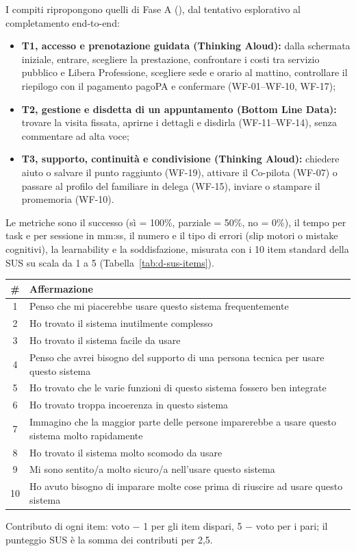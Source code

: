 I compiti ripropongono quelli di Fase A (), dal tentativo esplorativo al completamento end-to-end:
\begin{itemize}
\item \textbf{T1, accesso e prenotazione guidata (Thinking Aloud):} dalla schermata iniziale, entrare, scegliere la prestazione, confrontare i costi tra servizio pubblico e Libera Professione, scegliere sede e orario al mattino, controllare il riepilogo con il pagamento pagoPA e confermare (WF-01--WF-10, WF-17);
\item \textbf{T2, gestione e disdetta di un appuntamento (Bottom Line Data):} trovare la visita fissata, aprirne i dettagli e disdirla (WF-11--WF-14), senza commentare ad alta voce;
\item \textbf{T3, supporto, continuità e condivisione (Thinking Aloud):} chiedere aiuto o salvare il punto raggiunto (WF-19), attivare il Co-pilota (WF-07) o passare al profilo del familiare in delega (WF-15), inviare o stampare il promemoria (WF-10).
\end{itemize}
Le metriche sono il successo (sì = 100\%, parziale = 50\%, no = 0\%), il tempo per task e per sessione in mm:ss, il numero e il tipo di errori (slip motori o mistake cognitivi), la learnability e la soddisfazione, misurata con i 10 item standard della SUS su scala da 1 a 5 (Tabella~\ref{tab:d-sus-items}).

\begin{center}
\label{tab:d-sus-items}
\footnotesize
\begin{tabularx}{\linewidth}{@{}c >{\raggedright\arraybackslash}X@{}}
\toprule
\textbf{\#} & \textbf{Affermazione} \\
\midrule
1 & Penso che mi piacerebbe usare questo sistema frequentemente \\
2 & Ho trovato il sistema inutilmente complesso \\
3 & Ho trovato il sistema facile da usare \\
4 & Penso che avrei bisogno del supporto di una persona tecnica per usare questo sistema \\
5 & Ho trovato che le varie funzioni di questo sistema fossero ben integrate \\
6 & Ho trovato troppa incoerenza in questo sistema \\
7 & Immagino che la maggior parte delle persone imparerebbe a usare questo sistema molto rapidamente \\
8 & Ho trovato il sistema molto scomodo da usare \\
9 & Mi sono sentito/a molto sicuro/a nell'usare questo sistema \\
10 & Ho avuto bisogno di imparare molte cose prima di riuscire ad usare questo sistema \\
\bottomrule
\end{tabularx}
\par\smallskip
{\footnotesize Contributo di ogni item: voto $-$ 1 per gli item dispari, 5 $-$ voto per i pari; il punteggio SUS è la somma dei contributi per 2,5.}
\end{center}

